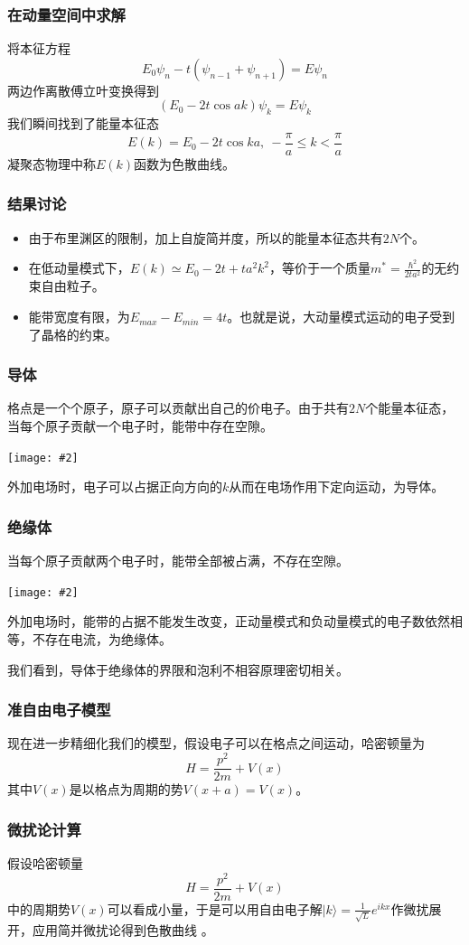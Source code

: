 \documentclass[CJK]{beamer}
\newcommand{\cpic}[2]{
\begin{center}
\texttt{[image: \#2]}
\end{center}
}
\begin{document}
\begin{frame}
\frametitle{\bch 在动量空间中求解 \ech}
\bch
将本征方程
$$
E_0 \psi_n - t (\psi_{n-1} + \psi_{n+1} ) = E\psi_n
$$
两边作离散傅立叶变换得到
$$
(E_0 -2t\cos ak)\psi_k = E \psi_k
$$
我们瞬间找到了能量本征态
$$
E(k) = E_0 - 2t \cos ka, \ -\frac{\pi}{a} \leq k < \frac{\pi}{a}
$$
凝聚态物理中称$E(k)$函数为色散曲线。
\ech
\end{frame}

\begin{frame}
\frametitle{\bch 结果讨论 \ech}
\bch
\begin{itemize}
\item 由于布里渊区的限制，加上自旋简并度，所以的能量本征态共有$2N$个。
\item 在低动量模式下，$E(k) \simeq E_0 -2t + ta^2 k^2$，等价于一个质量$m^* = \frac{\hbar^2}{2ta^2}$的无约束自由粒子。
\item 能带宽度有限，为$E_{max} - E_{min} = 4t$。也就是说，大动量模式运动的电子受到了晶格的约束。
\end{itemize}
\ech
\end{frame}

\begin{frame}
\frametitle{\bch 导体 \ech}
\bch
格点是一个个原子，原子可以贡献出自己的价电子。由于共有$2N$个能量本征态，当每个原子贡献一个电子时，能带中存在空隙。
\cpic{0.2}{half}
外加电场时，电子可以占据正向方向的$k$从而在电场作用下定向运动，为导体。
\ech
\end{frame}

\begin{frame}
\frametitle{\bch 绝缘体 \ech}
\bch
当每个原子贡献两个电子时，能带全部被占满，不存在空隙。
\cpic{0.2}{full}
外加电场时，能带的占据不能发生改变，正动量模式和负动量模式的电子数依然相等，不存在电流，为绝缘体。
\par
我们看到，导体于绝缘体的界限和泡利不相容原理密切相关。
\ech
\end{frame}

\begin{frame}
\frametitle{\bch 准自由电子模型 \ech}
\bch
现在进一步精细化我们的模型，假设电子可以在格点之间运动，哈密顿量为
$$
H = \frac{p^2}{2m} + V(x)
$$
其中$V(x)$是以格点为周期的势$V(x+a) = V(x)$。
\ech
\end{frame}





\begin{frame}
\frametitle{\bch 微扰论计算 \ech}
\bch
假设哈密顿量
$$
H = \frac{p^2}{2m} + V(x)
$$
中的周期势$V(x)$可以看成小量，于是可以用自由电子解$|k\rangle = \frac{1}{\sqrt{L}}e^{ikx}$作微扰展开，应用简并微扰论得到色散曲线
。
\ech
\end{frame}
\end{document}
